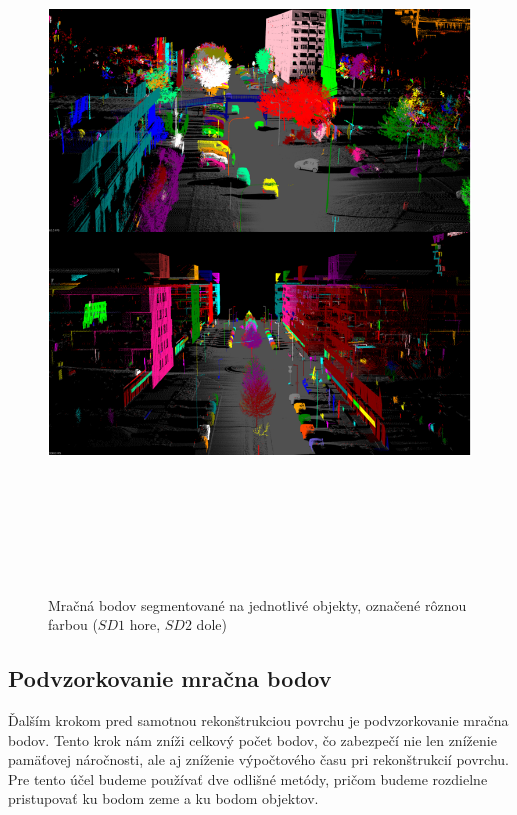 \newpage\vfill
\begin{figure}[ht]
  \centering
  \includegraphics[width=16cm, height=19cm]{img/segmentation.png}
  \caption{Mračná bodov segmentované na jednotlivé objekty, označené rôznou farbou ($SD1$ hore, $SD2$ dole)} 
  \label{fig:cpc_seg}
\end{figure} 
\vfill\clearpage

\subsection{Podvzorkovanie mračna bodov}
\noindent Ďalším krokom pred samotnou rekonštrukciou povrchu je podvzorkovanie mračna bodov. Tento krok nám zníži celkový počet bodov, čo zabezpečí nie len zníženie pamäťovej náročnosti, ale aj zníženie výpočtového času pri rekonštrukcií povrchu. Pre tento účel budeme používať dve odlišné metódy, pričom budeme rozdielne pristupovať ku bodom zeme a ku bodom objektov.
